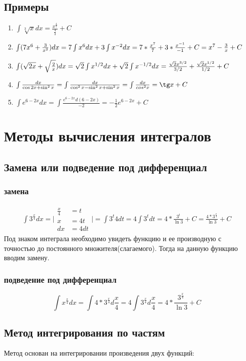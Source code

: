 \documentclass[12pt,a4paper]{article}
\begin{document}
\subsection{Примеры}
\begin{enumerate}[label=(\roman*), leftmargin=*, itemsep=0.4ex, before={\everymath{\displaystyle}}]%
\item{
$\int \sqrt[3]{x} dx = \frac{x^{\frac{4}{3}}}{\frac{4}{3}} + C$
}
\item{
$
\int (7x^6 + \frac{3}{x^2})dx = 7 \int x^6 dx + 3 \int x^{-2} dx
= 7 * \frac{x^7}{7} + 3 * \frac{x^{-1}}{-1} + C =\\ x^7 - \frac{3}{x} + C
$
}
\item{
$
\int (\sqrt{2x} + \sqrt{\frac{2}{x}})dx = \sqrt{2} \int x^{1/2}dx +
\sqrt{2} \int x^{-1/2}dx =\\ \frac{\sqrt{2} x^{3/2}}{3/2} +
\frac{\sqrt{2} x^{1/2}}{1/2} + C
$
}
\item{
$\int \frac{dx}{\cos 2x + \sin^2 x} =
\int \frac{dx}{\cos^2 x - \sin^2 x + \sin^2 x} =
\int \frac{dx}{cos^2 x} =
\tg x + C$
}
\item{
$
\int e^{6 - 2x} dx =
\int \frac{e^{6 - 2x}d(6 - 2x)}{-2} =
-\frac{1}{2} e^{6 - 2x} + C
$
}
\end{enumerate}
\clearpage
\section{Методы вычисления интегралов}
\subsection{Замена или подведение под дифференциал}
\subsubsection{замена}
\begin{align*}
\int 3^{\frac{x}{4}} dx = \Bigg|
\begin{split}
\frac{x}{4} & = t \\
x & = 4t \\
dx & = 4dt
\end{split}
\Bigg| = \int 3^t 4dt = 4 \int 3^t dt = 4 * \frac{3^t}{\ln 3} + C =
\frac{4 * 3^{\frac{x}{4}}}{\ln 3} + C
\end{align*}
Под знаком интеграла необходимо увидеть функцию и ее производную
с точностью до постоянного множителя(слагаемого).
Тогда на данную функцию вводим замену.
\subsubsection{подведение под дифференциал}
\[
\int x^{\frac{x}{4}} dx = \int 4 * 3^{\frac{x}{4}} d\frac{x}{4}
= 4 \int 3^{\frac{x}{4}} d\frac{x}{4} =
4 * \frac{3^{\frac{x}{4}}}{\ln 3} + C
\]
\subsection{Метод интегрирования по частям}
Метод основан на интегрировании произведения двух функций:
\end{document}
